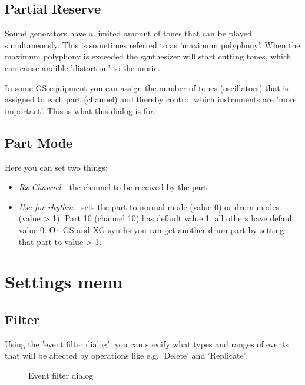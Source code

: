 \documentclass[letterpaper]{report}
\begin{document}
\subsection{Partial Reserve}

Sound generators have a limited amount of tones that can be played
simultaneously. This is sometimes referred to as 'maximum polyphony'.
When the maximum polyphony is exceeded the synthesizer will start
cutting tones, which can cause audible 'distortion' to the music.

In some GS equipment you can assign the number of tones (oscillators)
that is assigned to each part (channel) and thereby control which instruments
are 'more important'. This is what this dialog is for.

\subsection{Part Mode}

Here you can set two things:

\begin{itemize}
\item {\em Rx Channel} - the channel to be received by the part
\item {\em Use for rhythm} - sets the part to normal mode (value 0)
or drum modes (value > 1). Part 10 (channel 10) has default value 1,
all others have default value 0. On GS and XG synths you can get another drum
part by setting that part to value > 1.
\end{itemize}

\section{Settings menu}\label{twsettings}

\subsection{Filter}\label{midifilter}

Using the 'event filter dialog', you can specify what types and ranges of
events that will be affected by  operations like
e.g. 'Delete' and 'Replicate'.

\begin{figure}%
%
%
\caption{Event filter dialog}%
\end{figure}
\end{document}
